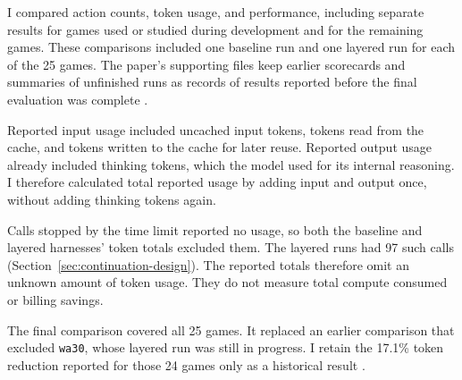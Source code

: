 I compared action counts, token usage, and performance, including separate results for games used or studied during development and for the remaining games. These comparisons included one baseline run and one layered run for each of the 25 games. The paper’s supporting files keep earlier scorecards and summaries of unfinished runs as records of results reported before the final evaluation was complete \citep{dai2026baselinefinalcard,dai2026layered,scorecard2026finalreplay,dai2026tokens}.

Reported input usage included uncached input tokens, tokens read from the cache, and tokens written to the cache for later reuse. Reported output usage already included thinking tokens, which the model used for its internal reasoning. I therefore calculated total reported usage by adding input and output once, without adding thinking tokens again.

Calls stopped by the time limit reported no usage, so both the baseline and layered harnesses' token totals excluded them. The layered runs had 97 such calls (Section~\ref{sec:continuation-design}). The reported totals therefore omit an unknown amount of token usage. They do not measure total compute consumed or billing savings.

The final comparison covered all 25 games. It replaced an earlier comparison that excluded \texttt{wa30}, whose layered run was still in progress. I retain the 17.1\% token reduction reported for those 24 games only as a historical result \citep{dai2026tokens}.
